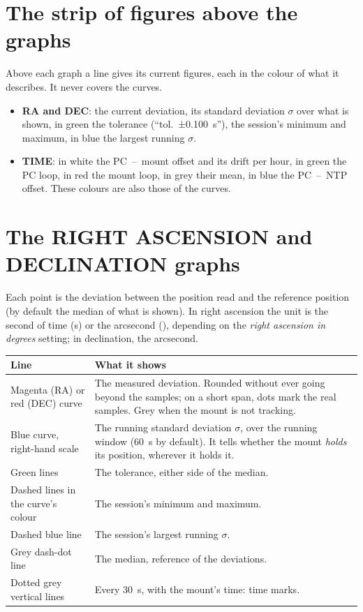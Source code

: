 \section{The strip of figures above the graphs}
\label{sec:strip}

Above each graph a line gives its current figures, each in the colour of what
it describes. It never covers the curves.

\begin{itemize}
  \item \textbf{RA and DEC}: the current deviation, its standard deviation
  $\sigma$ over what is shown, in green the tolerance (``tol.~±0.100~s''), the
  session's minimum and maximum, in blue the largest running $\sigma$.
  \item \textbf{TIME}: in white the PC~--~mount offset and its drift per hour,
  in green the PC loop, in red the mount loop, in grey their mean, in blue the
  PC~--~NTP offset. These colours are also those of the curves.
\end{itemize}

\section{The RIGHT ASCENSION and DECLINATION graphs}
\label{sec:radec}

Each point is the deviation between the position read and the reference
position (by default the median of what is shown). In right ascension the unit
is the second of time (s) or the arcsecond (\arcsec), depending on the
\emph{right ascension in degrees} setting; in declination, the arcsecond.

\begin{center}
\begin{tabularx}{\textwidth}{lX}
\toprule
\textbf{Line} & \textbf{What it shows} \\
\midrule
Magenta (RA) or red (DEC) curve & The measured deviation. Rounded without ever
going beyond the samples; on a short span, dots mark the real samples. Grey
when the mount is not tracking. \\
Blue curve, right-hand scale & The running standard deviation $\sigma$, over the
running window (60~s by default). It tells whether the mount \emph{holds} its
position, wherever it holds it. \\
Green lines & The tolerance, either side of the median. \\
Dashed lines in the curve's colour & The session's minimum and maximum. \\
Dashed blue line & The session's largest running $\sigma$. \\
Grey dash-dot line & The median, reference of the deviations. \\
Dotted grey vertical lines & Every 30~s, with the mount's time: time marks. \\
\bottomrule
\end{tabularx}
\end{center}

